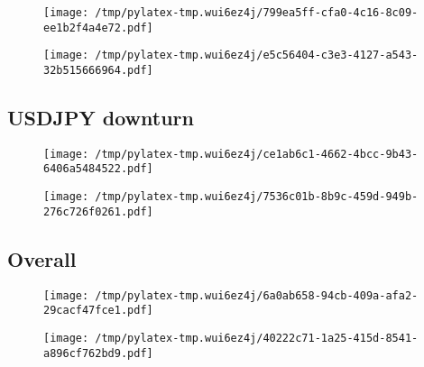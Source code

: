 \documentclass{article}%
\begin{document}
\begin{figure}[htbp]%
\centering%
\texttt{[image: /tmp/pylatex-tmp.wui6ez4j/799ea5ff-cfa0-4c16-8c09-ee1b2f4a4e72.pdf]}%
\end{figure}

%


\begin{figure}[htbp]%
\centering%
\texttt{[image: /tmp/pylatex-tmp.wui6ez4j/e5c56404-c3e3-4127-a543-32b515666964.pdf]}%
\end{figure}

%
\newpage %
\subsection{USDJPY downturn}%
\label{subsec:USDJPYdownturn}%


\begin{figure}[htbp]%
\centering%
\texttt{[image: /tmp/pylatex-tmp.wui6ez4j/ce1ab6c1-4662-4bcc-9b43-6406a5484522.pdf]}%
\end{figure}

%


\begin{figure}[htbp]%
\centering%
\texttt{[image: /tmp/pylatex-tmp.wui6ez4j/7536c01b-8b9c-459d-949b-276c726f0261.pdf]}%
\end{figure}

%
\newpage %
\subsection{Overall}%
\label{subsec:Overall}%


\begin{figure}[htbp]%
\centering%
\texttt{[image: /tmp/pylatex-tmp.wui6ez4j/6a0ab658-94cb-409a-afa2-29cacf47fce1.pdf]}%
\end{figure}

%


\begin{figure}[htbp]%
\centering%
\texttt{[image: /tmp/pylatex-tmp.wui6ez4j/40222c71-1a25-415d-8541-a896cf762bd9.pdf]}%
\end{figure}

%
\end{document}
